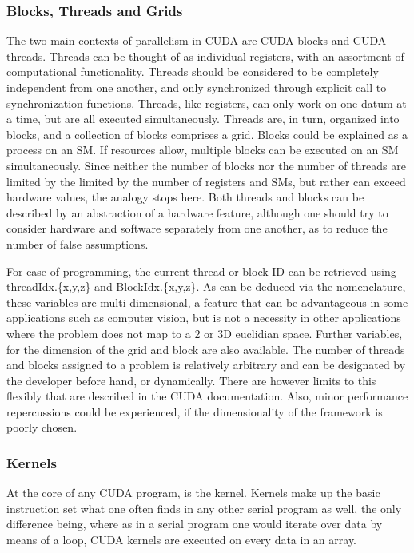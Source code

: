 \subsubsection{Blocks, Threads and Grids}\label{btg}
The two main contexts of parallelism in CUDA are CUDA blocks and CUDA threads.
Threads can be thought of as individual registers, with an assortment of computational
functionality.  Threads should be considered to be completely independent from one another,
and only synchronized through explicit call to synchronization functions. Threads, like
registers, can only work on one datum at a time, but are all executed simultaneously.
Threads are, in turn, organized into blocks, and a collection of blocks comprises a grid.
Blocks could be explained as a process on an SM. If resources allow, multiple blocks can
be executed on an \Gls{SM} simultaneously. Since neither the number of blocks nor the
number of threads are limited by the limited by the number of registers and \Glspl{SM},
but rather can exceed hardware values, the analogy stops here.  Both
threads and blocks can be described by an abstraction of a hardware feature, although one should try to
consider hardware and software separately from one another, as to reduce the number
of false assumptions.
\par
For ease of programming, the current thread or block ID can be retrieved using
 threadIdx.\{x,y,z\} and BlockIdx.\{x,y,z\}. As can be deduced via the nomenclature,
 these variables are multi-dimensional, a feature that can be advantageous in some
 applications such as computer vision, but is not a necessity in other applications
where the problem does not map to a 2 or 3D euclidian space. Further variables,
for the dimension of the grid and block are also available. %
The number of threads and blocks assigned to a problem is relatively arbitrary and can
be designated by the developer before hand, or dynamically.  There are however limits
to this flexibly that are described in the CUDA documentation\cite{bestpractices}.
  Also, minor performance
repercussions could be experienced, if the dimensionality of the framework is poorly
chosen.
\subsubsection{Kernels}

At the core of any CUDA program, is the kernel. Kernels make up the basic instruction
set what one often finds in any other serial program as well, the only difference being,
where as in a serial program one would iterate over data by means of a loop,
CUDA kernels are executed on every data in an array.

